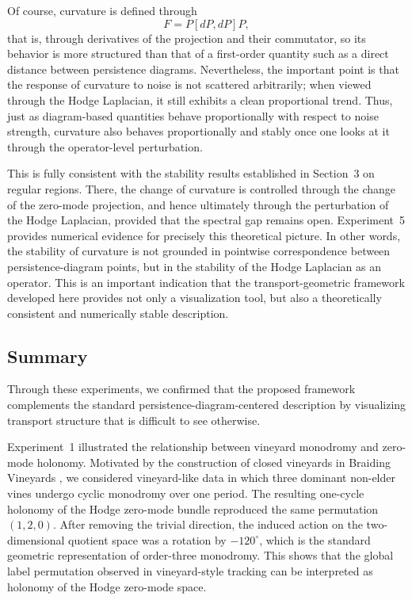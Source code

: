 \documentclass[pdflatex,sn-mathphys-num]{sn-jnl}%
\theoremstyle{thmstyleone}%
\theoremstyle{thmstyletwo}%
\theoremstyle{thmstylethree}%
\begin{document}
Of course, curvature is defined through
\[
F = P[dP,dP]P,
\]
that is, through derivatives of the projection and their commutator, so its behavior is more structured than that of a first-order quantity such as a direct distance between persistence diagrams. Nevertheless, the important point is that the response of curvature to noise is not scattered arbitrarily; when viewed through the Hodge Laplacian, it still exhibits a clean proportional trend. Thus, just as diagram-based quantities behave proportionally with respect to noise strength, curvature also behaves proportionally and stably once one looks at it through the operator-level perturbation.

This is fully consistent with the stability results established in Section~3 on regular regions. There, the change of curvature is controlled through the change of the zero-mode projection, and hence ultimately through the perturbation of the Hodge Laplacian, provided that the spectral gap remains open. Experiment~5 provides numerical evidence for precisely this theoretical picture. In other words, the stability of curvature is not grounded in pointwise correspondence between persistence-diagram points, but in the stability of the Hodge Laplacian as an operator. This is an important indication that the transport-geometric framework developed here provides not only a visualization tool, but also a theoretically consistent and numerically stable description.

\subsection{Summary}

Through these experiments, we confirmed that the proposed framework complements the standard persistence-diagram-centered description by visualizing transport structure that is difficult to see otherwise.

Experiment~1 illustrated the relationship between vineyard monodromy and zero-mode holonomy. Motivated by the construction of closed vineyards in Braiding Vineyards \cite{chambers2026braiding}, we considered vineyard-like data in which three dominant non-elder vines undergo cyclic monodromy over one period. The resulting one-cycle holonomy of the Hodge zero-mode bundle reproduced the same permutation \((1,2,0)\). After removing the trivial direction, the induced action on the two-dimensional quotient space was a rotation by \(-120^\circ\), which is the standard geometric representation of order-three monodromy. This shows that the global label permutation observed in vineyard-style tracking can be interpreted as holonomy of the Hodge zero-mode space.
\end{document}
